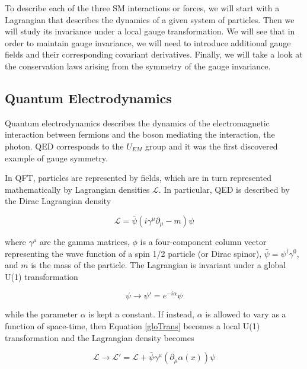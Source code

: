 To describe each of the three SM interactions or forces, we will start with a Lagrangian that describes the dynamics of a given system of particles. Then we will study its invariance under a local gauge transformation. We will see that in order to maintain gauge invariance, we will need to introduce additional gauge fields and their corresponding covariant derivatives. Finally, we will take a look at the conservation laws arising from the symmetry of the gauge invariance.

\subsection{Quantum Electrodynamics}

Quantum electrodynamics describes the dynamics of the electromagnetic interaction between fermions and the boson mediating the interaction, the photon. QED corresponds to the $U_{EM}$ group and it was the first discovered example of gauge symmetry.%

In QFT, particles are represented by fields, which are in turn represented mathematically by Lagrangian densities $\mathcal{L}$. In particular, QED is described by the Dirac Lagrangian density

\begin{equation}
\mathcal{L} = \bar{\psi}(i\gamma^{\mu}\partial_{\mu} - m)\psi
\end{equation}

where $\gamma^{\mu}$ are the gamma matrices, $\phi$ is a four-component column vector representing the wave function of a spin 1/2 particle (or Dirac spinor), $\bar{\psi}=\psi^{\dagger}\gamma^{0}$, and $m$ is the mass of the particle. The Lagrangian is invariant under a global U(1) transformation

\begin{equation}
\label{gloTrans}
\psi \rightarrow \psi '= e^{-i\alpha}\psi
\end{equation}

while the parameter $\alpha$ is kept a constant. If instead, $\alpha$ is allowed to vary as a function of space-time, then Equation \ref{gloTrans} becomes a local U(1) transformation and the Lagrangian density becomes

\begin{equation}
\mathcal{L}\rightarrow \mathcal{L'} = \mathcal{L} + \bar{\psi}\gamma^{\mu}(\partial_{\mu}\alpha(x))\psi
\end{equation}

